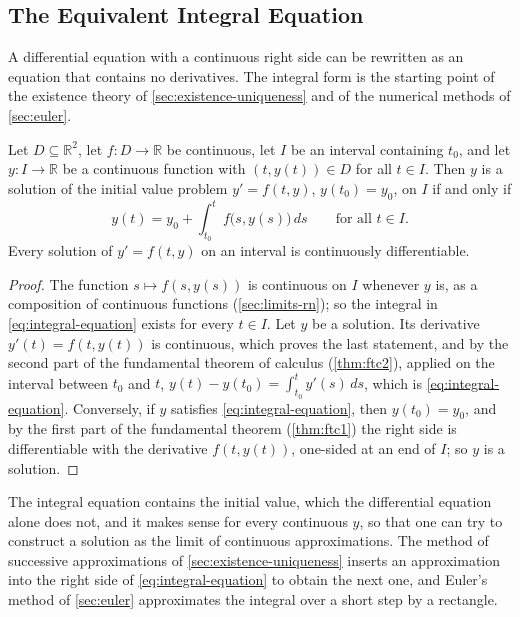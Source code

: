 \subsection{The Equivalent Integral Equation}

A differential equation with a continuous right side can be rewritten as an equation that contains no derivatives. The integral form is the starting point of the existence theory of \cref{sec:existence-uniqueness} and of the numerical methods of \cref{sec:euler}.

\begin{proposition}
\label{prop:integral-equation}
Let $D\subseteq\mathbb R^2$, let $f\colon D\to\mathbb R$ be continuous, let $I$ be an interval containing $t_0$, and let $y\colon I\to\mathbb R$ be a continuous function with $(t,y(t))\in D$ for all $t\in I$. Then $y$ is a solution of the initial value problem $y'=f(t,y)$, $y(t_0)=y_0$, on $I$ if and only if
\begin{equation}
y(t)=y_0+\int_{t_0}^tf\bigl(s,y(s)\bigr)\,ds\qquad\text{for all }t\in I .
\label{eq:integral-equation}
\end{equation}
Every solution of $y'=f(t,y)$ on an interval is continuously differentiable.
\end{proposition}

\begin{proof}
The function $s\mapsto f(s,y(s))$ is continuous on $I$ whenever $y$ is, as a composition of continuous functions (\cref{sec:limits-rn}); so the integral in \eqref{eq:integral-equation} exists for every $t\in I$. Let $y$ be a solution. Its derivative $y'(t)=f(t,y(t))$ is continuous, which proves the last statement, and by the second part of the fundamental theorem of calculus (\cref{thm:ftc2}), applied on the interval between $t_0$ and $t$, $y(t)-y(t_0)=\int_{t_0}^ty'(s)\,ds$, which is \eqref{eq:integral-equation}. Conversely, if $y$ satisfies \eqref{eq:integral-equation}, then $y(t_0)=y_0$, and by the first part of the fundamental theorem (\cref{thm:ftc1}) the right side is differentiable with the derivative $f(t,y(t))$, one-sided at an end of $I$; so $y$ is a solution.
\end{proof}

The integral equation contains the initial value, which the differential equation alone does not, and it makes sense for every continuous $y$, so that one can try to construct a solution as the limit of continuous approximations. The method of successive approximations of \cref{sec:existence-uniqueness} inserts an approximation into the right side of \eqref{eq:integral-equation} to obtain the next one, and Euler's method of \cref{sec:euler} approximates the integral over a short step by a rectangle.

